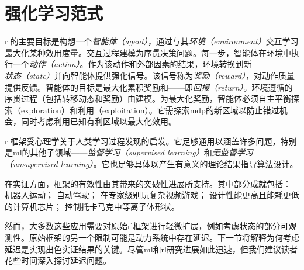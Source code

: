 \section{强化学习范式}

\gls{rl}的主要目标是构想一个\emph{智能体（agent）}，通过与其\emph{环境（environment）}交互学习最大化某种效用度量。交互过程建模为序贯决策问题。每一步，智能体在环境中执行一个\emph{动作（action）}。作为该动作和外部因素的结果，环境转换到新\emph{状态（state）}并向智能体提供强化信号。该信号称为\emph{奖励（reward）}，对动作质量提供反馈。智能体的目标是最大化累积奖励和——即\emph{回报（return）}。环境遵循的序贯过程（包括转移动态和奖励）由建模。为最大化奖励，智能体必须自主平衡探索（exploration）和利用（exploitation）。它需探索\gls{mdp}的新区域以防止错过机会，同时考虑利用已知有利区域以最大化效用。

\gls{rl}框架受心理学关于人类学习过程发现的启发。它足够通用以涵盖许多问题，特别是\gls{ml}的其他子领域——\emph{监督学习（supervised learning）}和\emph{无监督学习（unsupervised learning）}。它也足够具体以产生有意义的理论结果指导算法设计。

在实证方面，框架的有效性由其带来的突破性进展所支持。其中部分成就包括：
机器人运动\cite{haarnoja2018learning}；
自动驾驶\cite{kiran2021deep}；
在专家级别玩复杂视频游戏\cite{vinyals2019grandmaster}；
设计性能更高且能耗更低的计算机芯片\cite{mirhoseini2021graph}；
控制托卡马克中等离子体形状\cite{degrave2022magnetic}。

然而，大多数这些应用需要对原始\gls{rl}框架进行轻微扩展，例如考虑状态的部分可观测性。原始框架的另一个限制可能是动力系统中存在延迟。下一节将解释为何考虑延迟是实现出色实证结果的关键。尽管\gls{ml}和\gls{rl}研究进展如此迅速，但我们建议读者花些时间深入探讨延迟问题。
